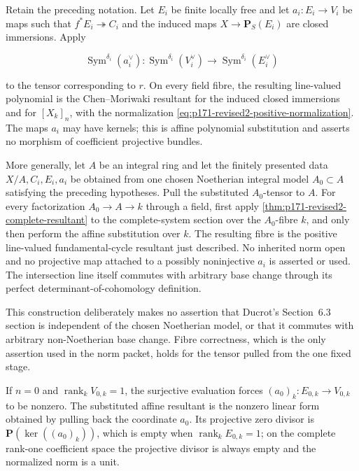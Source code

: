 \begin{theorem}
\label{thm:p171-revised2-one-stage-bridge}
Retain the preceding notation.  Let \(E_i\) be finite locally free and let
\(a_i:E_i\to V_i\) be maps such that
\(f^*E_i\twoheadrightarrow C_i\) and the induced maps
\(X\to\mathbf P_S(E_i)\) are closed immersions.  Apply

\[
 \operatorname{Sym}^{\delta_i}(a_i^\vee):
 \operatorname{Sym}^{\delta_i}(V_i^\vee)\longrightarrow
 \operatorname{Sym}^{\delta_i}(E_i^\vee)
\]

to the tensor corresponding to \(r\).  On every field fibre, the resulting
line-valued polynomial is the Chen--Moriwaki resultant for the induced
closed immersions and for \([X_k]_n\), with the normalization
\eqref{eq:p171-revised2-positive-normalization}.  The maps \(a_i\) may have
kernels; this is affine polynomial substitution and asserts no morphism of
coefficient projective bundles.

More generally, let \(A\) be an integral ring and let the finitely presented
data \(X/A,C_i,E_i,a_i\) be obtained from one chosen Noetherian integral
model \(A_0\subset A\) satisfying the preceding hypotheses.  Pull the
substituted \(A_0\)-tensor to \(A\).  For every factorization
\(A_0\to A\to k\) through a field, first apply
\cref{thm:p171-revised2-complete-resultant} to the complete-system
section over the \(A_0\)-fibre \(k\), and only then perform the affine
substitution over \(k\).  The resulting fibre is the positive line-valued
fundamental-cycle resultant just described.  No inherited norm open and no
projective map attached to a possibly noninjective \(a_i\) is asserted or
used.  The intersection line itself commutes with arbitrary base change
through its perfect determinant-of-cohomology definition.

This construction deliberately makes no assertion that Ducrot's
Section~6.3 section is independent of the chosen Noetherian model, or that
it commutes with arbitrary non-Noetherian base change.  Fibre correctness,
which is the only assertion used in the norm packet, holds for the tensor
pulled from the one fixed stage.

If \(n=0\) and \(\operatorname{rank}_kV_{0,k}=1\), the surjective
evaluation forces \((a_0)_k:E_{0,k}\to V_{0,k}\) to be nonzero.  The
substituted affine resultant is the nonzero linear form obtained by pulling
back the coordinate \(a_0\).  Its projective zero divisor is
\(\mathbf P(\ker((a_0)_k))\), which is empty when
\(\operatorname{rank}_kE_{0,k}=1\); on the complete rank-one coefficient
space the projective divisor is always empty and the normalized norm is a
unit.
\end{theorem}


